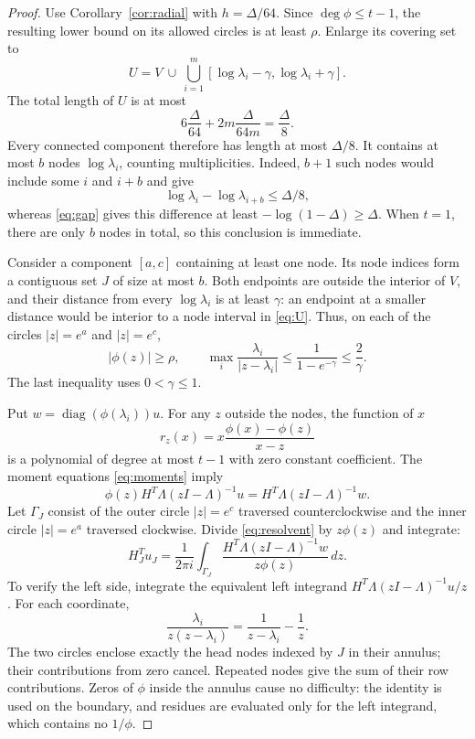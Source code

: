 \documentclass[11pt]{article}
\numberwithin{equation}{section}
\theoremstyle{definition}
\newcommand{\diag}{\operatorname{diag}}
\begin{document}
\begin{proof}
Use Corollary~\ref{cor:radial} with $h=\Delta/64$. Since $\deg\phi\le t-1$, the resulting lower bound on its allowed circles is at least $\rho$. Enlarge its covering set to
\begin{equation}\label{eq:U}
U=V\ \cup\ \bigcup_{i=1}^m[\log\lambda_i-\gamma,\log\lambda_i+\gamma].
\end{equation}
The total length of $U$ is at most
\[
6\frac{\Delta}{64}+2m\frac{\Delta}{64m}=\frac{\Delta}{8}.
\]
Every connected component therefore has length at most $\Delta/8$. It contains at most $b$ nodes $\log\lambda_i$, counting multiplicities. Indeed, $b+1$ such nodes would include some $i$ and $i+b$ and give
\[
\log\lambda_i-\log\lambda_{i+b}\le\Delta/8,
\]
whereas \eqref{eq:gap} gives this difference at least $-\log(1-\Delta)\ge\Delta$. When $t=1$, there are only $b$ nodes in total, so this conclusion is immediate.

Consider a component $[a,c]$ containing at least one node. Its node indices form a contiguous set $J$ of size at most $b$. Both endpoints are outside the interior of $V$, and their distance from every $\log\lambda_i$ is at least $\gamma$: an endpoint at a smaller distance would be interior to a node interval in \eqref{eq:U}. Thus, on each of the circles $|z|=e^a$ and $|z|=e^c$,
\begin{equation}\label{eq:contourbounds}
|\phi(z)|\ge\rho,
\qquad
\max_i\frac{\lambda_i}{|z-\lambda_i|}
\le\frac1{1-e^{-\gamma}}\le\frac2\gamma.
\end{equation}
The last inequality uses $0<\gamma\le1$.

Put $w=\diag(\phi(\lambda_i))u$. For any $z$ outside the nodes, the function of $x$
\[
r_z(x)=x\frac{\phi(x)-\phi(z)}{x-z}
\]
is a polynomial of degree at most $t-1$ with zero constant coefficient. The moment equations \eqref{eq:moments} imply
\begin{equation}\label{eq:resolvent}
\phi(z)H^T\Lambda(zI-\Lambda)^{-1}u
=H^T\Lambda(zI-\Lambda)^{-1}w.
\end{equation}
Let $\Gamma_J$ consist of the outer circle $|z|=e^c$ traversed counterclockwise and the inner circle $|z|=e^a$ traversed clockwise. Divide \eqref{eq:resolvent} by $z\phi(z)$ and integrate:
\begin{equation}\label{eq:annularidentity}
H_J^Tu_J
=\frac1{2\pi i}\int_{\Gamma_J}
\frac{H^T\Lambda(zI-\Lambda)^{-1}w}{z\phi(z)}\,dz.
\end{equation}
To verify the left side, integrate the equivalent left integrand
$H^T\Lambda(zI-\Lambda)^{-1}u/z$. For each coordinate,
\[
\frac{\lambda_i}{z(z-\lambda_i)}
=\frac1{z-\lambda_i}-\frac1z.
\]
The two circles enclose exactly the head nodes indexed by $J$ in their annulus; their contributions from zero cancel. Repeated nodes give the sum of their row contributions. Zeros of $\phi$ inside the annulus cause no difficulty: the identity is used on the boundary, and residues are evaluated only for the left integrand, which contains no $1/\phi$.


\end{proof}
\end{document}
